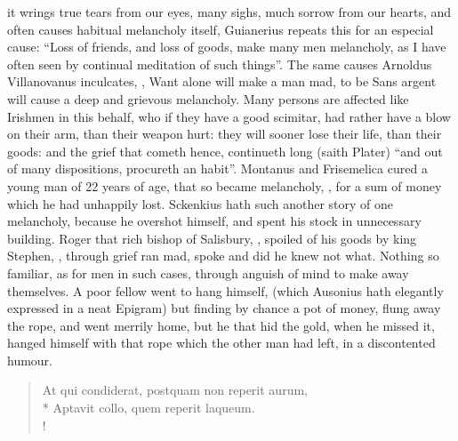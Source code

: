 it wrings true tears from our eyes, many sighs, much sorrow from our hearts,
and often causes habitual melancholy itself, Guianerius
 repeats this for an especial cause:
\enquote{Loss of friends, and loss of goods, make many men
melancholy, as I have often seen by continual meditation of such things}. The
same causes Arnoldus Villanovanus inculcates,  , \etc{} Want alone
will make a man mad, to be Sans argent will cause a deep and grievous
melancholy. Many persons are affected like Irishmen in
this behalf, who if they have a good scimitar, had rather have a blow on their
arm, than their weapon hurt: they will sooner lose their life, than their
goods: and the grief that cometh hence, continueth long (saith
Plater) \enquote{and out of many dispositions, procureth an
habit}. Montanus and Frisemelica cured a young man of 22
years of age, that so became melancholy, , for a sum of
money which he had unhappily lost. Sckenkius hath such another story of one
melancholy, because he overshot himself, and spent his stock in unnecessary
building. Roger that rich bishop of Salisbury, , spoiled of his goods by king Stephen,
, through
grief ran mad, spoke and did he knew not what. Nothing so familiar, as for men
in such cases, through anguish of mind to make away themselves. A poor fellow
went to hang himself, (which Ausonius hath elegantly expressed in a neat
Epigram) but finding by chance a pot of money, flung away
the rope, and went merrily home, but he that hid the gold, when he missed it,
hanged himself with that rope which the other man had left, in a discontented
humour.

\begin{latin}
\begin{verse}%
At qui condiderat, postquam non reperit aurum,\\*
Aptavit collo, quem reperit laqueum.\\!
\end{verse}%
\end{latin}

